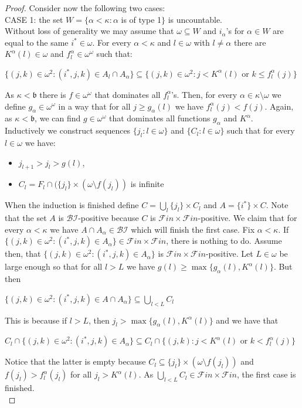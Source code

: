 \documentclass[a4paper]{amsart}
\newcommand{\bbb}{\mathfrak{b}}
\newcommand{\Baire}{\omega^{\omega}}
\newcommand{\FF}{\mathcal{F}in\times\mathcal{F}in}
\newcommand{\BI}{\mathcal{BI}}
\begin{document}
\begin{proof}
    Consider now the following two cases:\\
    CASE 1: the set $W=\{\alpha<\kappa: \alpha$ is of type 1$\}$ is uncountable.\\
    Without loss of generality we may assume that $\omega\subseteq W$ and $i_{\alpha}$'s for $\alpha\in W$ are equal to the same $i^{*}\in\omega$. For every $\alpha<\kappa$ and $l\in\omega$ with $l\neq\alpha$ there are $K^{\alpha}(l)\in\omega$ and $f^{\alpha}_{l}\in\Baire$ such that:
    \begin{center}
    $\{(j,k)\in\omega^{2}:(i^{*},j,k)\in A_{l}\cap A_{\alpha}\}\subseteq\{(j,k)\in\omega^{2}:j<K^{\alpha}(l)$ or $k\leq f^{\alpha}_{l}(j)\}$
    \end{center}
    As $\kappa<\bbb$ there is $f\in\Baire$ that dominates all $f^{\alpha}_{l}$'s. Then, for every $\alpha\in\kappa\setminus\omega$ we define $g_{\alpha}\in\Baire$ in a way that for all $j\geq g_{\alpha}(l)$ we have $f^{\alpha}_{l}(j)<f(j)$. Again, as $\kappa<\bbb$, we can find $g\in\Baire$ that dominates all functions $g_{\alpha}$ and $K^{\alpha}$.\\
    Inductively we construct sequences $\{j_{l}:l\in\omega\}$ and $\{C_{l}:l\in\omega\}$ such that for every $l\in\omega$ we have:
    \begin{itemize}
        \item[--] $j_{l+1}>j_{l}>g(l)$,
        \item[--] $C_{l}=F_{l}\cap (\{j_{l}\}\times(\omega\setminus f(j_{l}))$ is infinite
    \end{itemize}
    When the induction is finished define $C=\bigcup_{l}\{j_{l}\}\times C_{l}$ and $A=\{i^{*}\}\times C$. Note that the set $A$ is $\BI$-positive because $C$ is $\FF$-positive. We claim that for every $\alpha<\kappa$ we have $A\cap A_{\alpha}\in\BI$ which will finish the first case. Fix $\alpha<\kappa$. If $\{(j,k)\in\omega^{2}:(i^{*},j,k)\in A_{\alpha}\}\in\FF$, there is nothing to do. Assume then, that $\{(j,k)\in\omega^{2}:(i^{*},j,k)\in A_{\alpha}\}$ is $\FF$-positive. Let $L\in\omega$ be large enough so that for all $l>L$ we have $g(l)\geq\max\{g_{\alpha}(l),K^{\alpha}(l)\}$. But then
    \begin{center}
        $\{(j,k)\in\omega^{2}:(i^{*},j,k)\in A\cap A_{\alpha}\}\subseteq\bigcup_{l<L}C_{l}$
    \end{center}
    This is because if $l>L$, then $j_{l}>\max\{g_{\alpha}(l),K^{\alpha}(l)\}$ and we have that
    \begin{center}
    $C_{l}\cap\{(j,k)\in\omega^{2}:(i^{*},j,k)\in A_{\alpha}\}\subseteq C_{l}\cap \{(j,k):j<K^{\alpha}(l)$ or $k<f^{\alpha}_{l}(j)\}$
    \end{center}
    Notice that the latter is empty because $C_{l}\subseteq\{j_{l}\}\times(\omega\setminus f(j_{l}))$ and $f(j_{l})>f^{\alpha}_{l}(j_{l})$ for all $j_{l}>K^{\alpha}(l)$. As $\bigcup_{l<L}C_{l}\in\FF$, the first case is finished.\\
    

\end{proof}
\end{document}
